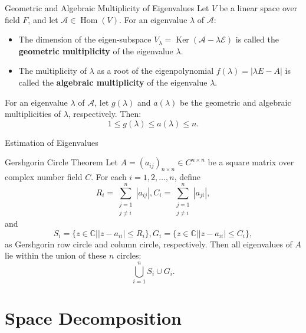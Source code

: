 \documentclass[11pt]{../../TexTemplate/elegantbook} %
\begin{document}
\begin{definition}{Geometric and Algebraic Multiplicity of Eigenvalues}
    Let \( V \) be a linear space over field \( F \), 
    and let \( \mathcal{A}\in \operatorname{Hom}(V) \).
    For an eigenvalue \( \lambda \) of \( \mathcal{A} \):
    \begin{itemize}
        \item The dimension of the eigen-subspace \( V_{\lambda} = \operatorname{Ker}(\mathcal{A} - \lambda \mathcal{E}) \)
            is called the \textbf{geometric multiplicity} of the eigenvalue \( \lambda \).
        \item The multiplicity of \( \lambda \) as a root of the eigenpolynomial \( f(\lambda) = |\lambda E - A| \)
            is called the \textbf{algebraic multiplicity} of the eigenvalue \( \lambda \).
    \end{itemize}
\end{definition}

\begin{property}
    For an eigenvalue \( \lambda \) of \( \mathcal{A} \),
    let \( g(\lambda) \) and \( a(\lambda) \) be the geometric and algebraic multiplicities of \( \lambda \), respectively.
    Then:
    \[
    1 \leqslant g(\lambda) \leqslant a(\lambda) \leqslant n.
    \]
\end{property}

\begin{leftbarTitle}{Estimation of Eigenvalues}\end{leftbarTitle}
\begin{theorem}{Gershgorin Circle Theorem}
    Let \( A = (a_{ij})_{n \times n} \in C^{n \times n} \) be a square matrix over complex number field \( C \).
    For each \( i = 1, 2, \dots, n \), define
    \[
    R_i = \sum_{\substack{j=1 \\ j \neq i}}^{n} |a_{ij}|,
    C_i = \sum_{\substack{j=1 \\ j \neq i}}^{n} |a_{ji}|,
    \]
    and
    \[
    S_{i} = \{ z \in \mathbb{C} | |z - a_{ii}| \leqslant R_i \},
    G_{i} = \{ z \in \mathbb{C} | |z - a_{ii}| \leqslant C_i \},
    \]
    as Gershgorin row circle and column circle, respectively.
    Then all eigenvalues of \( A \) lie within the union of these \( n \) circles:
    \[
    \bigcup_{i=1}^{n} S_{i} \cup G_{i}.
    \]
\end{theorem}


\section{Space Decomposition}
\end{document}
